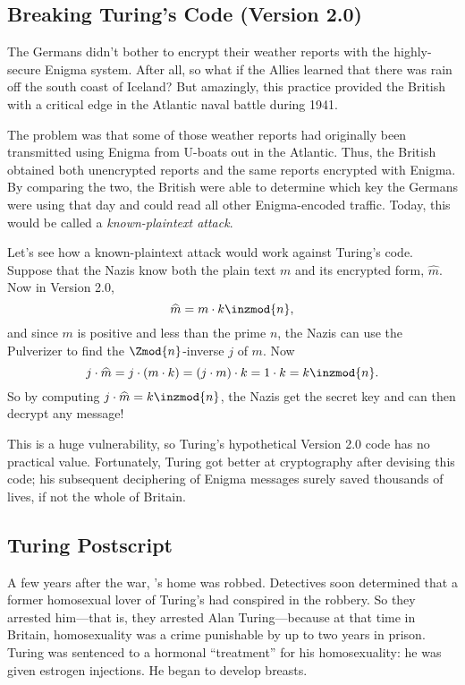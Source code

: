\subsection{Breaking Turing's Code (Version 2.0)}

The Germans didn't bother to encrypt their weather reports with the
highly-secure Enigma system.  After all, so what if the Allies learned
that there was rain off the south coast of Iceland?  But amazingly,
this practice provided the British with a critical edge in the
Atlantic naval battle during 1941.

The problem was that some of those weather reports had originally been
transmitted using Enigma from U-boats out in the Atlantic.  Thus, the
British obtained both unencrypted reports and the same reports
encrypted with Enigma.  By comparing the two, the British were able to
determine which key the Germans were using that day and could read all
other Enigma-encoded traffic.  Today, this would be called a
\emph{known-plaintext attack}.

Let's see how a known-plaintext attack would work against Turing's
code.  Suppose that the Nazis know both the plain text $m$ and its
encrypted form, $\widehat{m}$.  Now in Version 2.0,
\[
\widehat{m} = m \cdot k \inzmod{n},
\]
and since $m$ is positive and less than the prime $n$, the Nazis can
use the Pulverizer to find the $\Zmod{n}$-inverse $j$ of $m$.  Now
\[
j \cdot \widehat{m} = j \cdot (m \cdot k) = (j \cdot m) \cdot k
= 1 \cdot k = k \inzmod{n}.
\]
So by computing $j \cdot \widehat{m} = k \inzmod{n}$, the Nazis get the
secret key and can then decrypt any message!

This is a huge vulnerability, so Turing's hypothetical Version 2.0
code has no practical value.  Fortunately, Turing got better at
cryptography after devising this code; his subsequent deciphering of
Enigma messages surely saved thousands of lives, if not the whole of
Britain.


\subsection{Turing Postscript}

A few years after the war, 's home was robbed.  Detectives soon
determined that a former homosexual lover of Turing's had conspired in
the robbery.  So they arrested him---that is, they arrested Alan
Turing---because at that time in Britain, homosexuality was a crime punishable by up
to two years in prison.  Turing was sentenced to a
hormonal ``treatment'' for his homosexuality: he was given estrogen
injections.  He began to develop breasts.

